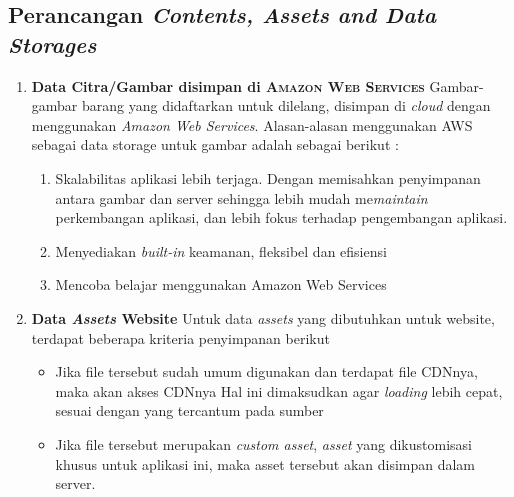     
\subsection{Perancangan \textit{Contents, Assets and Data Storages}}

	\begin{enumerate}
	    \item \textbf{Data Citra/Gambar disimpan di \textsc{Amazon Web Services}} \newline
	    \indent Gambar-gambar barang yang didaftarkan untuk dilelang, disimpan di \textit{cloud} dengan menggunakan \textit{Amazon Web Services}. Alasan-alasan menggunakan AWS sebagai data storage untuk gambar adalah sebagai berikut :
	        \begin{enumerate}[noitemsep,topsep=0pt]
	        \item Skalabilitas aplikasi lebih terjaga. 
	        \newline Dengan memisahkan penyimpanan antara gambar dan server sehingga lebih mudah me\textit{maintain} perkembangan aplikasi, dan lebih fokus terhadap pengembangan aplikasi.
	        \item Menyediakan \textit{built-in} keamanan, fleksibel dan efisiensi \cite{wikipedia_amazon_2016}
	        \item Mencoba belajar menggunakan Amazon Web Services
	        \end{enumerate}
	        
	    \item \textbf{Data \textit{Assets} Website}
	    \newline
	    \indent Untuk data \textit{assets} yang dibutuhkan untuk website, terdapat beberapa kriteria penyimpanan berikut
	    
	      \begin{itemize}[noitemsep,topsep=0pt]
	      \item Jika file tersebut sudah umum digunakan dan terdapat file CDNnya, maka akan akses CDNnya
	      \newline
	      Hal ini dimaksudkan agar \textit{loading} lebih cepat, sesuai dengan yang tercantum pada sumber \cite{sitepoint_7_2011}
	      \item Jika file tersebut merupakan \textit{custom asset}, \textit{asset} yang dikustomisasi khusus untuk aplikasi ini, maka asset tersebut akan disimpan dalam server.
	      \end{itemize}
    \end{enumerate}